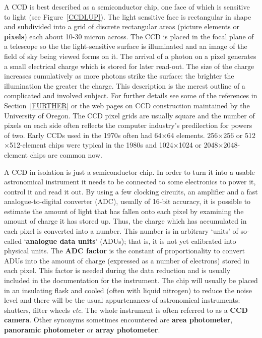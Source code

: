 \documentclass[twoside,11pt]{article}
\newcommand{\htmladdnormallink}[2]{#1}
\newcommand{\html}[1]{}
\newcommand{\latex}[1]{#1}
\begin{document}
A CCD is best described as a semiconductor chip, one face of which is
sensitive to light (see Figure~\ref{CCDLUP}).  The light sensitive face is
rectangular in shape and subdivided into a grid of discrete rectangular
areas (picture elements or {\bf pixels}) each about 10-30 micron across.
The CCD is placed in the focal plane of a telescope so the the
light-sensitive surface is illuminated and an image of the field of sky
being viewed forms on it.  The arrival of a photon on a pixel generates a
small electrical charge which is stored for later read-out.  The size of
the charge increases cumulatively as more photons strike the surface: the
brighter the illumination the greater the charge. 
This description is the merest outline of a complicated and involved
subject.  For further details see some of the references in
Section~\ref{FURTHER} or the \htmladdnormallink{web pages on CCD construction}
{http://zebu.uoregon.edu/ccd.html} maintained by the University of Oregon.
The CCD pixel grids are usually square and the number of pixels on each
side often reflects the computer industry's predilection for powers of two.
\latex{Early CCDs used in the 1970s often had 64$\times$64 elements.
256$\times$256 or 512$\times$512-element chips were typical in the
1980s and 1024$\times$1024 or 2048$\times$2048-element chips are
common now.}
\html{Early CCDs used in the 1970s often had 64x64 elements. 256x256
or 512x512-element chips were typical in the 1980s and 1024x1024 or
2048x2048-element chips are common now.}

A CCD in isolation is just a semiconductor chip.  In order to turn it
into a usable astronomical instrument it needs to be connected to some
electronics to power it, control it and read it out.  By using a few
clocking circuits, an amplifier and a fast analogue-to-digital converter
(ADC), usually of 16-bit accuracy, it is possible to estimate the amount of
light that has fallen onto each pixel by examining the amount of charge it
has stored up.  Thus, the charge which has accumulated in each pixel is
converted into a number.  This number is in arbitrary `units' of so-called
`{\bf analogue data units}' (ADUs); that is, it is not yet calibrated into
physical units.  The {\bf ADC factor} is the constant of proportionality
to convert ADUs into the amount of charge (expressed as a number of
electrons) stored in each pixel.  This factor is needed during the data
reduction and is usually included in the documentation for the instrument.
The chip will usually be placed in an insulating flask and cooled (often
with liquid nitrogen) to reduce the noise level and there will be the usual
appurtenances of astronomical instruments: shutters, filter wheels
\emph{etc}.  The whole instrument is often referred to as a {\bf CCD camera}.
Other synonyms sometimes encountered are {\bf area photometer}, {\bf
panoramic photometer} or {\bf array photometer}.
\end{document}
